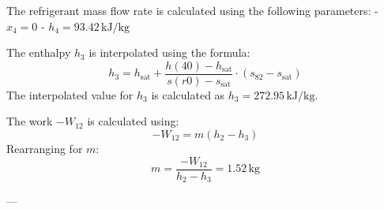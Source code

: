 The refrigerant mass flow rate is calculated using the following parameters:  
- \( x_4 = 0 \)  
- \( h_4 = 93.42 \, \text{kJ/kg} \)

The enthalpy \( h_3 \) is interpolated using the formula:  
\[
h_3 = h_{\text{sat}} + \frac{h(40) - h_{\text{sat}}}{s(r0) - s_{\text{sat}}} \cdot (s_{82} - s_{\text{sat}})
\]  
The interpolated value for \( h_3 \) is calculated as \( h_3 = 272.95 \, \text{kJ/kg} \).  

The work \( -W_{12} \) is calculated using:  
\[
-W_{12} = m(h_2 - h_3)
\]  
Rearranging for \( m \):  
\[
m = \frac{-W_{12}}{h_2 - h_3} = 1.52 \, \text{kg}
\]  

---